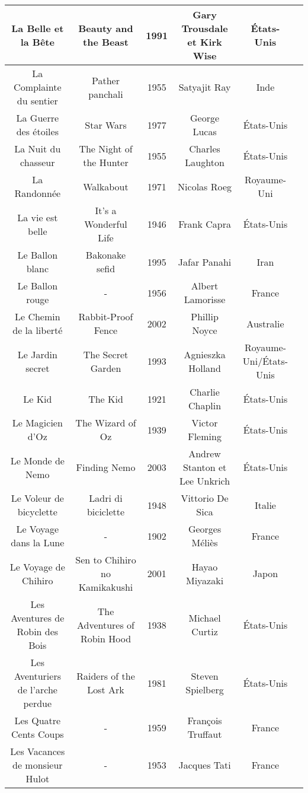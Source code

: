 \documentclass[a4paper]{article}
\begin{document}
\begin{tabular}{|c|c|c|c|c|c|}
\hline 
La Belle et la Bête & Beauty and the Beast & 1991 & Gary Trousdale et Kirk Wise & États-Unis &  \\ 
\hline 
La Complainte du sentier & Pather panchali & 1955 & Satyajit Ray & Inde &  \\ 
\hline 
La Guerre des étoiles & Star Wars & 1977 & George Lucas & États-Unis &  \\ 
\hline 
La Nuit du chasseur & The Night of the Hunter & 1955 & Charles Laughton & États-Unis &  \\ 
\hline 
La Randonnée & Walkabout & 1971 & Nicolas Roeg & Royaume-Uni &  \\ 
\hline 
La vie est belle & It's a Wonderful Life & 1946 & Frank Capra & États-Unis &  \\ 
\hline 
Le Ballon blanc & Bakonake sefid & 1995 & Jafar Panahi & Iran &  \\ 
\hline 
Le Ballon rouge & - & 1956 & Albert Lamorisse & France &  \\ 
\hline 
Le Chemin de la liberté & Rabbit-Proof Fence & 2002 & Phillip Noyce & Australie &  \\ 
\hline 
Le Jardin secret & The Secret Garden & 1993 & Agnieszka Holland & Royaume-Uni/États-Unis &  \\ 
\hline 
Le Kid & The Kid & 1921 & Charlie Chaplin & États-Unis &  \\ 
\hline 
Le Magicien d'Oz & The Wizard of Oz & 1939 & Victor Fleming & États-Unis &  \\ 
\hline 
Le Monde de Nemo & Finding Nemo & 2003 & Andrew Stanton et Lee Unkrich & États-Unis &  \\ 
\hline 
Le Voleur de bicyclette & Ladri di biciclette & 1948 & Vittorio De Sica & Italie &  \\ 
\hline 
Le Voyage dans la Lune & - & 1902 & Georges Méliès & France &  \\ 
\hline 
Le Voyage de Chihiro & Sen to Chihiro no Kamikakushi & 2001 & Hayao Miyazaki & Japon &  \\ 
\hline 
Les Aventures de Robin des Bois & The Adventures of Robin Hood & 1938 & Michael Curtiz & États-Unis &  \\ 
\hline 
Les Aventuriers de l'arche perdue & Raiders of the Lost Ark & 1981 & Steven Spielberg & États-Unis &  \\ 
\hline 
Les Quatre Cents Coups & - & 1959 & François Truffaut & France &  \\ 
\hline 
Les Vacances de monsieur Hulot & - & 1953 & Jacques Tati & France &  \\ 

\end{tabular}
\end{document}
